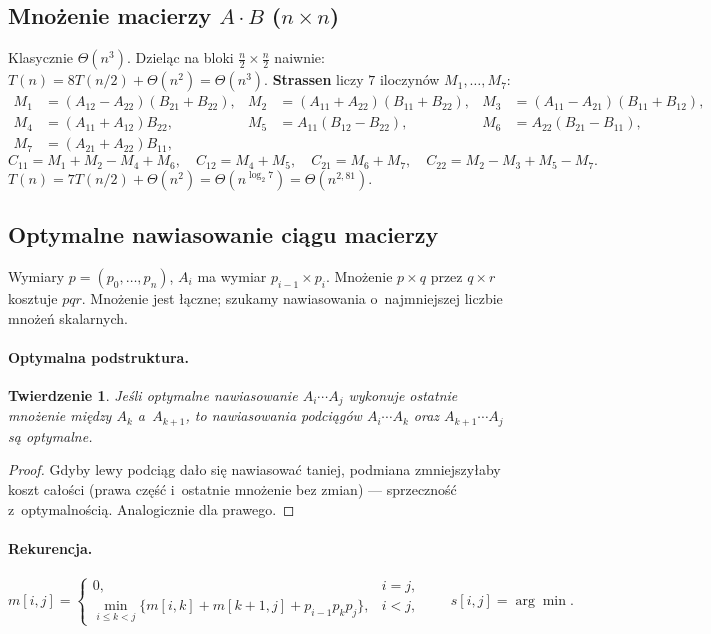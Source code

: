 \documentclass[11pt,a4paper]{article}
\theoremstyle{plain}
\newtheorem{twierdzenie}{Twierdzenie}[section]
\theoremstyle{definition}
\begin{document}
\subsection*{Mnożenie macierzy $A\cdot B$ ($n\times n$)}
Klasycznie $\Theta(n^3)$. Dzieląc na bloki $\tfrac n2\times\tfrac n2$ naiwnie: $T(n)=8T(n/2)+\Theta(n^2)=\Theta(n^3)$.
\textbf{Strassen} liczy $7$ iloczynów $M_1,\dots,M_7$:
\[
\begin{aligned}
M_1&=(A_{12}-A_{22})(B_{21}+B_{22}), & M_2&=(A_{11}+A_{22})(B_{11}+B_{22}), & M_3&=(A_{11}-A_{21})(B_{11}+B_{12}),\\
M_4&=(A_{11}+A_{12})B_{22}, & M_5&=A_{11}(B_{12}-B_{22}), & M_6&=A_{22}(B_{21}-B_{11}),\\
M_7&=(A_{21}+A_{22})B_{11},
\end{aligned}
\]
\[
C_{11}=M_1+M_2-M_4+M_6,\quad C_{12}=M_4+M_5,\quad C_{21}=M_6+M_7,\quad C_{22}=M_2-M_3+M_5-M_7.
\]
$T(n)=7T(n/2)+\Theta(n^2)=\Theta(n^{\log_2 7})=\Theta(n^{2{,}81})$.

\subsection*{Optymalne nawiasowanie ciągu macierzy}
Wymiary $p=(p_0,\dots,p_n)$, $A_i$ ma wymiar $p_{i-1}\times p_i$. Mnożenie $p\times q$ przez $q\times r$
kosztuje $pqr$. Mnożenie jest łączne; szukamy nawiasowania o~najmniejszej liczbie mnożeń skalarnych.

\paragraph{Optymalna podstruktura.}
\begin{twierdzenie}\label{tw:mco}
Jeśli optymalne nawiasowanie $A_i\cdots A_j$ wykonuje ostatnie mnożenie między $A_k$ a~$A_{k+1}$, to
nawiasowania podciągów $A_i\cdots A_k$ oraz $A_{k+1}\cdots A_j$ są optymalne.
\end{twierdzenie}
\begin{proof}
Gdyby lewy podciąg dało się nawiasować taniej, podmiana zmniejszyłaby koszt całości (prawa część i~ostatnie
mnożenie bez zmian) --- sprzeczność z~optymalnością. Analogicznie dla prawego.
\end{proof}

\paragraph{Rekurencja.}
\[
m[i,j]=\begin{cases}0,& i=j,\\[2pt]\displaystyle\min_{i\le k<j}\{m[i,k]+m[k+1,j]+p_{i-1}p_k p_j\},& i<j,\end{cases}
\qquad s[i,j]=\arg\min.
\]
\end{document}
